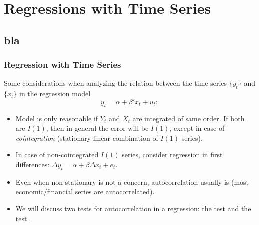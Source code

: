 \section{Regressions with Time Series}\subsection*{bla}
\begin{frame}%
\frametitle{Regression with Time Series}

Some considerations when analyzing the relation between the time series $\{y_{t}\}$
and $\{x_{t}\}$ in the regression model%
\begin{equation*}
y_{t}=\alpha +\beta' x_{t}+u_{t}:
\end{equation*}

\begin{itemize}
\item Model is only reasonable if $Y_{t}$ and $X_{t}$ are integrated of same
order. If both are $I(1)$, then in general the error will be $I(1)$, except
in case of \emph{\color{red}cointegration} (stationary linear combination of $I(1)$
series).

\item In case of non-cointegrated $I(1)$ series, consider regression in
first differences: $\Delta y_{t}=\alpha +\beta \Delta x_{t}+e_{t}$.

\item Even when non-stationary is not a concern, autocorrelation usually is (most economic/financial series are autocorrelated).
\item We will discuss two tests for autocorrelation in a regression: the  test and the  test.
%
\end{itemize}
\end{frame}%


